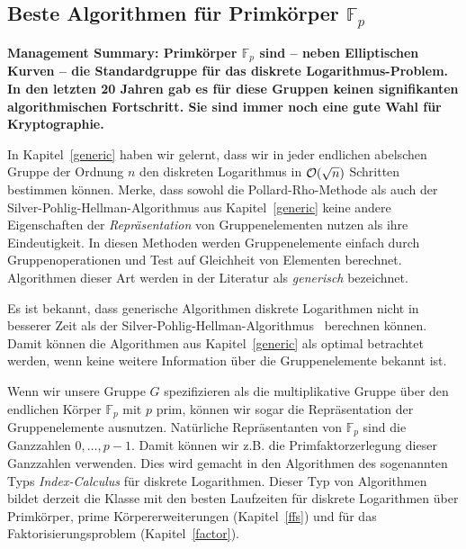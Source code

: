 \begin{refsegment}
\newpage
\section{\texorpdfstring{Beste Algorithmen für Primkörper $\mathbb{F}_p$}{Beste Algorithmen für Primkörper Fp}}
\label{prime_field}
\textbf{Management Summary: Primkörper $\mathbb{F}_p$ sind -- neben Elliptischen Kurven -- die Standardgruppe für das diskrete Logarithmus-Problem. In den letzten 20 Jahren gab es für diese Gruppen keinen signifikanten algorithmischen Fortschritt. Sie sind immer noch eine gute Wahl für Kryptographie.\\[0.1cm]}

In Kapitel~\ref{generic} haben wir gelernt, dass wir in jeder endlichen abelschen Gruppe der Ordnung $n$ den diskreten Logarithmus in ${\cal O}(\sqrt n)$ Schritten bestimmen können. Merke, dass sowohl die Pollard-Rho-Methode als auch der Silver-Pohlig-Hellman-Algorithmus aus Kapitel~\ref{generic} keine andere Eigenschaften der {\em Repräsentation} von Gruppenelementen nutzen als ihre Eindeutigkeit. In diesen Methoden werden Gruppenelemente einfach durch Gruppenoperationen und Test auf Gleichheit von Elementen berechnet. Algorithmen dieser Art werden in der Literatur als {\em generisch} bezeichnet.

Es ist bekannt, dass generische Algorithmen diskrete Logarithmen nicht in besserer Zeit als der Silver-Pohlig-Hellman-Algorithmus~\cite{Shoup1997} berechnen können. Damit können die Algorithmen aus Kapitel~\ref{generic} als optimal betrachtet werden, wenn keine weitere Information über die Gruppenelemente bekannt ist.

Wenn wir unsere Gruppe $G$ spezifizieren als die multiplikative Gruppe über den endlichen Körper $\mathbb{F}_p$ mit $p$ prim, können wir sogar die Repräsentation der Gruppenelemente ausnutzen. Natürliche Repräsentanten von $\mathbb{F}_p$ sind die Ganzzahlen $0, \ldots, p-1$. Damit können wir z.B. die Primfaktorzerlegung dieser Ganzzahlen verwenden. Dies wird gemacht in den Algorithmen des sogenannten Typs {\em Index-Calculus} für diskrete Logarithmen. Dieser Typ von Algorithmen bildet derzeit die Klasse mit den besten Laufzeiten für diskrete Logarithmen über Primkörper, prime Körpererweiterungen (Kapitel~\ref{ffs}) und für das Faktorisierungsproblem (Kapitel~\ref{factor}).


\end{refsegment}
